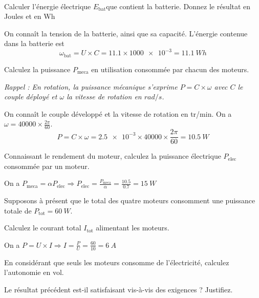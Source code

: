 \documentclass[10pt,fleqn]{article} %
\begin{document}
\begin{exercise}~

\begin{question}
  Calculer l’énergie électrique $E_\text{bat}$que contient la batterie. Donnez le résultat en Joules et en \si{Wh}
\end{question}
\begin{solution}
  On connaît la tension de la batterie, ainsi que sa capacité. L'énergie
  contenue dans la batterie est $$\omega_\text{bat} = U\times C = 11.1 \times \num{1000e-3}=\SI{11.1}{Wh} $$
\end{solution}
\begin{question}
    Calculez la puissance $P_\text{meca}$ en utilisation consommée par chacun des moteurs.

    \textit{Rappel : En rotation, la puissance mécanique s'exprime $P = C\times \omega$ avec $C$ le couple déployé et $\omega$ la vitesse de rotation en $\si{rad/s}$.}
\end{question}
\begin{solution}
On connaît le couple développé et la vitesse de rotation en \si{tr/min}. On a $\omega = 40000\times \frac{2\pi}{60}$. $$P = C\times\omega = \num{2.5e-3}\times 40000 \times \frac{2\pi}{60} = \SI{10.5}{W} $$
\end{solution}

\begin{question}
  Connaissant le rendement du moteur, calculez la puissance électrique $P_\text{elec}$ consommée par un moteur.
\end{question}
\begin{solution}
  On a $P_\text{meca} = \alpha P_\text{elec} \Rightarrow P_\text{elec} = \frac{P_\text{meca}}{\alpha} = \frac{10.5}{0.7} = \SI{15}{W}$
\end{solution}

\begin{question}
  Supposons à présent que le total des quatre moteurs consomment une puissance totale de $P_\text{tot} = \SI{60}{W}$.

  Calculez le courant total $I_\text{tot}$ alimentant les moteurs.
\end{question}
\begin{solution}
  On a $P = U\times I \Rightarrow I = \frac{P}{U} = \frac{60}{10} = \SI{6}{A}$
\end{solution}

\begin{question}
    En considérant que seuls les moteurs consomme de l'électricité, calculez l'autonomie en vol.
\end{question}


\begin{question}
    Le résultat précédent est-il satisfaisant vis-à-vis des exigences ? Justifiez.
\end{question}
\end{exercise}
\end{document}
